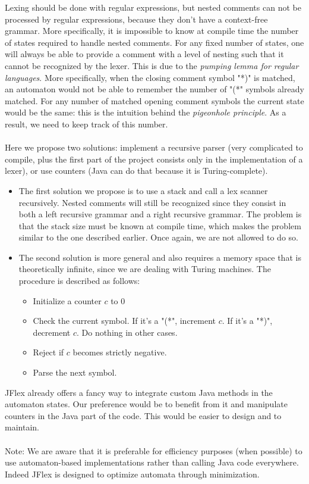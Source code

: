 \documentclass[12pt]{report}
\begin{document}
Lexing should be done with regular expressions, but nested comments can not be processed by regular expressions, because they don't have
a context-free grammar. More specifically, it is impossible to know at compile time the number of states required to handle nested comments.
For any fixed number of states, one will always be able to provide a comment with a level of nesting such that it cannot be recognized by the lexer.
This is due to the \textit{pumping lemma for regular languages}. More specifically, when the closing comment symbol "*)" is matched, an automaton
would not be able to remember the number of "(*" symbols already matched. For any number of matched opening comment symbols the current state
would be the same: this is the intuition behind the \textit{pigeonhole principle}. As a result, we need to keep track of this number. \\ \\
Here we propose two solutions: implement a recursive parser (very complicated to compile, plus the first part of the project consists only in the implementation
of a lexer), or use counters (Java can do that because it is Turing-complete).
\begin{itemize}
\item The first solution we propose is to use a stack and call a lex scanner recursively.
Nested comments will still be recognized since they consist in both a left recursive grammar and a right recursive grammar. The problem is that
the stack size must be known at compile time, which makes the problem similar to the one described earlier. Once again, we are not allowed to do so.
\item The second solution is more general and also requires a memory space that is theoretically infinite, since we are dealing with Turing machines.
The procedure is described as follows:
      \begin{itemize}
        \item{Initialize a counter $c$ to 0}
        \item{Check the current symbol. If it's a "(*", increment $c$. If it's a "*)", decrement $c$. Do nothing in other cases.}
        \item{Reject if $c$ becomes strictly negative.}
        \item{Parse the next symbol.}
      \end{itemize}
\end{itemize}
JFlex already offers a fancy way to integrate custom Java methods in the automaton states. Our preference would be to benefit from it and
manipulate counters in the Java part of the code. This would be easier to design and to maintain. \\ \\
Note: We are aware that it is preferable for efficiency purposes (when possible) to use automaton-based implementations rather than calling Java code everywhere. Indeed JFlex is designed to optimize automata through minimization.
\end{document}
